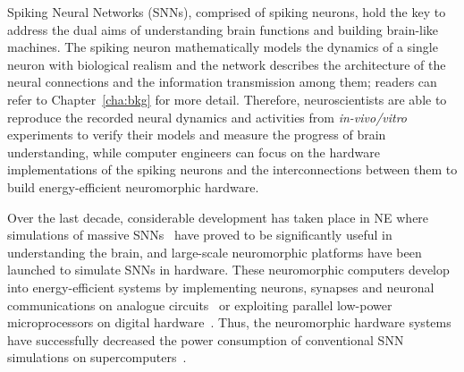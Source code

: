 Spiking Neural Networks (SNNs), comprised of spiking neurons, hold the key to address the dual aims of understanding brain functions and building brain-like machines.
The spiking neuron mathematically models the dynamics of a single neuron with biological realism and the network describes the architecture of the neural connections and the information transmission among them; readers can refer to Chapter~\ref{cha:bkg} for more detail.
Therefore, neuroscientists are able to reproduce the recorded neural dynamics and activities from \textit{in-vivo/vitro} experiments to verify their models and measure the progress of brain understanding,
while computer engineers can focus on the hardware implementations of the spiking neurons and the interconnections between them to build energy-efficient neuromorphic hardware.

Over the last decade, considerable development has taken place in NE where simulations of massive SNNs~\citep{markram2006blue,ananthanarayanan2009cat} have proved to be significantly useful in understanding the brain, and large-scale neuromorphic platforms have been launched to simulate SNNs in hardware.
These neuromorphic computers develop into energy-efficient systems by implementing neurons, synapses and neuronal communications on analogue circuits~\citep{schemmel2010wafer,benjamin2014neurogrid,yu201265k} or exploiting parallel low-power microprocessors on digital hardware~\citep{furber2014spinnaker,merolla2014million}. 
Thus, the neuromorphic hardware systems have successfully decreased the power consumption of conventional SNN simulations on supercomputers~\citep{de2010world,sharp2012power}.

